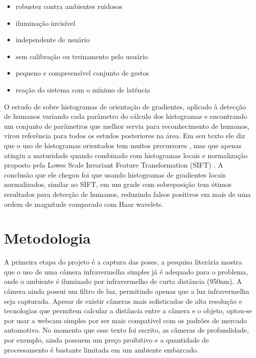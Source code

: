 \begin{itemize}
\item robustez contra ambientes ruidosos
\item iluminação invisível
\item independente de usuário
\item sem calibração ou treinamento pelo usuário
\item pequeno e compreensível conjunto de gestos
\item reação do sistema com o mínimo de latência
\end{itemize}

O estudo de  sobre histogramas de orientação de gradientes, aplicado à detecção de humanos variando cada parâmetro do cálculo dos histogramas e encontrando um conjunto de parâmetros que melhor servia para reconhecimento de humanos, virou referência para todos os estudos posteriores na área. Em seu texto ele diz que o uso de histogramas orientados tem muitos precursores \cite{freeman1995orientation, freeman1996computer}, mas que apenas atingiu a maturidade quando combinado com histogramas locais e normalização proposto pela Lowes Scale Invariant Feature Transformation (SIFT) \cite{lowe2004distinctive}. A conclusão que ele chegou foi que usando histogramas de gradientes locais normalizados, similar ao SIFT, em um grade com sobreposição tem ótimos resultados para detecção de humanos, reduzindo falsos positivos em mais de uma ordem de magnitude comparado com Haar wavelets.

\section{Metodologia}

A primeira etapa do projeto é a captura das poses, a pesquisa literária mostra \cite{zobl2004gesture, akyol2000gesture} que o uso de uma câmera infravermelha simples já é adequado para o problema, onde o ambiente é iluminado por infravermelho de curta distância (950nm). A câmera ainda possui um filtro de luz, permitindo apenas que a luz infravermelha seja capturada. Apesar de existir câmeras mais sofisticadas de alta resolução e tecnologias que permitem calcular a distância entre a câmera e o objeto, optou-se por usar a webcam simples por ser mais compatível com os padrões de mercado automotivo. No momento que esse texto foi escrito, as câmeras de profundidade, por exemplo, ainda possuem um preço proibitivo e a quantidade de processamento é bastante limitada em um ambiente embarcado.

